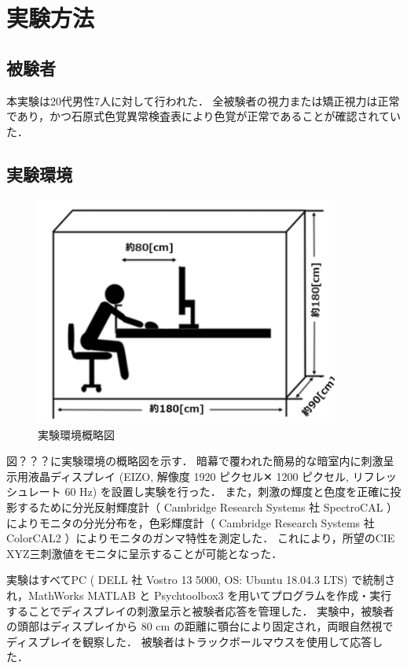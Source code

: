 \section{実験方法}
    \subsection{被験者}
        本実験は20代男性7人に対して行われた．
        全被験者の視力または矯正視力は正常であり，かつ石原式色覚異常検査表により色覚が正常であることが確認されていた．

    \subsection{実験環境}

        \begin{figure}[h]
            \centering
            \includegraphics[width=10.0cm]{./img/darkroom_p.png}
            \caption{実験環境概略図}
            \label{darkroom}
        \end{figure}

        図？？？に実験環境の概略図を示す．
        暗幕で覆われた簡易的な暗室内に刺激呈示用液晶ディスプレイ (EIZO, 解像度 1920 ピクセル✕ 1200 ピクセル, リフレッシュレート 60 Hz) を設置し実験を行った．
        また，刺激の輝度と色度を正確に投影するために分光反射輝度計（ Cambridge Research Systems 社 SpectroCAL ） によりモニタの分光分布を，色彩輝度計（ Cambridge Research Systems 社 ColorCAL2 ）によりモニタのガンマ特性を測定した．
        これにより，所望のCIE XYZ三刺激値をモニタに呈示することが可能となった．
        
        実験はすべてPC ( DELL 社 Vostro 13 5000, OS: Ubuntu 18.04.3 LTS) で統制され，MathWorks MATLAB と Psychtoolbox3 を用いてプログラムを作成・実行することでディスプレイの刺激呈示と被験者応答を管理した．
        実験中，被験者の頭部はディスプレイから 80 cm の距離に顎台により固定され，両眼自然視でディスプレイを観察した．
        被験者はトラックボールマウスを使用して応答した．

